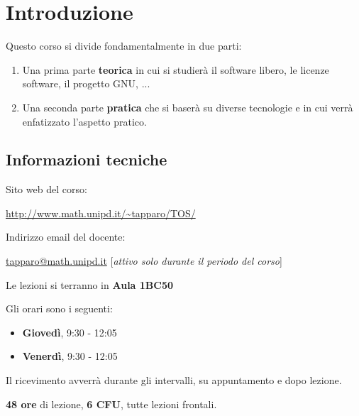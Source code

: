\chapter{Introduzione}

Questo corso si divide fondamentalmente in due parti:

\begin{enumerate}

	\item Una prima parte \textbf{teorica} in cui si studierà il software libero, le licenze software, il progetto GNU, ...
	\item Una seconda parte \textbf{pratica} che si baserà su diverse tecnologie e in cui verrà enfatizzato l'aspetto pratico.

\end{enumerate}

\section{Informazioni tecniche}

Sito web del corso:

\begin{center}

\url{http://www.math.unipd.it/~tapparo/TOS/}

\end{center}

Indirizzo email del docente:

\begin{center}

\url{tapparo@math.unipd.it} [\textit{attivo solo durante il periodo del corso}]

\end{center}

Le lezioni si terranno in \textbf{Aula 1BC50}

Gli orari sono i seguenti:

\begin{itemize}

\item \textbf{Giovedì}, 9:30 - 12:05
\item \textbf{Venerdì}, 9:30 - 12:05

\end{itemize}

Il ricevimento avverrà durante gli intervalli, su appuntamento e dopo lezione.

\textbf{48 ore} di lezione, \textbf{6 CFU}, tutte lezioni frontali.

